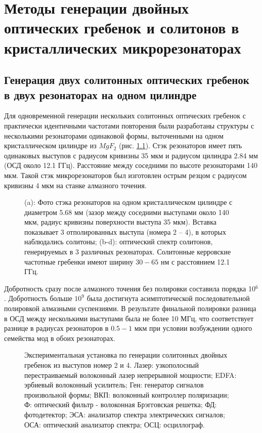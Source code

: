 \chapter{Методы генерации двойных оптических гребенок и солитонов в кристаллических микрорезонаторах} \label{chapt4}

\section{Генерация двух солитонных оптических гребенок в двух резонаторах на одном цилиндре}

Для одновременной генерации нескольких солитонных оптических гребенок \cite{Pavlov2017} с практически идентичными частотами повторения были разработаны структуры с несколькими резонаторами одинаковой формы, выточенными на одном кристаллическом цилиндре из $MgF_2$ (рис. \ref{ris:image1}). Стэк резонаторов имеет пять одинаковых выступов с радиусом кривизны 35 мкм и радиусом цилиндра 2.84 мм (ОСД около 12.1 ГГц). Расстояние между соседними по высоте резонаторами 140 мкм. Такой стэк микрорезонаторов был изготовлен острым резцом с радиусом кривизны 4 мкм на станке алмазного точения.

\begin{figure}[!htb]
\begin{minipage}{1\linewidth}
\end{minipage}
\caption{(a): Фото стэка резонаторов на одном кристаллическом цилиндре с диаметром 5.68 мм (зазор между соседними выступами около 140 мкм, радиус кривизны поверхности выступа 35 мкм). Вставка показывает 3 отполированных выступа (номера 2 -- 4), в которых наблюдались солитоны; (b-d): оптический спектр солитонов, генерируемых в 3 различных резонаторах. Солитонные керровские частотные гребенки имеют ширину $30 - 65$ нм с расстоянием 12.1 ГГц.}
\label{ris:image1}
\end{figure}

Добротность сразу после алмазного точения без полировки составила порядка 10$^6$. Добротность больше $10^9$ была достигнута асимптотической последовательной полировкой алмазными суспензиями. В результате финальной полировки разница в ОСД между несколькими выступами была не более 10 МГц, что соответствует разнице в радиусах резонаторов в $0.5 - 1$ мкм при условии возбуждении одного семейства мод в обоих резонаторах.

\begin{figure}[!htb]
\begin{minipage}{1\linewidth}
\end{minipage}
\caption{Экспериментальная установка по генерации солитонных двойных гребенок из выступов номер 2 и 4. Лазер: узкополосный перестраиваемый волоконный лазер непрерывной мощности; EDFA: эрбиевый волоконный усилитель; Ген: генератор сигналов произвольной формы; ВКП:  волоконный контроллер поляризации; Ф: оптический фильтр - волоконная Брэгговская решетка; ФД: фотодетектор; ЭСА: анализатор спектра электрических сигналов; ОСА: оптический анализатор спектра; ОСЦ: осциллограф.}
\label{ris:image2}
\end{figure}

